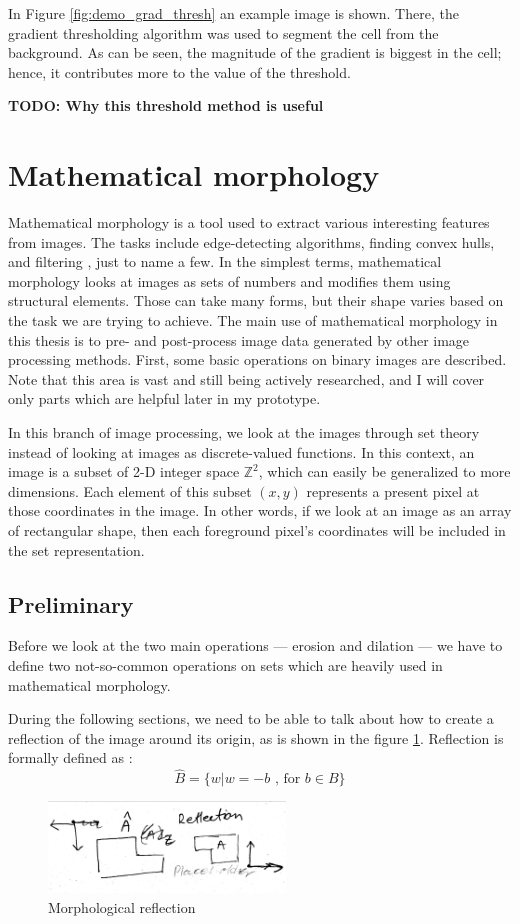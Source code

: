 \documentclass[
  digital,     %
  oneside,     %
  nosansbold,  %
  nocolorbold, %
  lof,         %
  lot,         %
]{fithesis4}
\newcommand*{\Z}{\ensuremath{\mathbb{Z}}}
\begin{document}
In Figure \ref{fig:demo_grad_thresh} an example image is shown. There, the
gradient thresholding algorithm was used to segment the cell from the
background. As can be seen, the magnitude of the gradient is biggest in the
cell; hence, it contributes more to the value of the threshold.

\textbf{TODO: Why this threshold method is useful}

\section{Mathematical morphology}

Mathematical morphology is a tool used to extract various interesting features
from images. The tasks include edge-detecting algorithms, finding convex hulls, and filtering
, just to name a few. In the simplest terms,
mathematical morphology looks at images as sets of numbers and modifies them using structural elements. Those can take many forms, but their shape varies based on the task we are trying
to achieve. The main use of mathematical morphology in this thesis is
to pre- and post-process image data generated by other image processing methods.
First, some basic operations on binary images are described. Note that
this area is vast and still being actively researched, and I will cover only parts which are helpful later in my
prototype.

In this branch of image processing, we look at the images through set theory
instead of looking at images as discrete-valued functions. In this context, an
image is a subset of 2-D integer space $\Z^2$, which can easily be generalized
to more dimensions. Each element of this subset $(x, y)$ represents a present
pixel at those coordinates in the image. In other words, if we look at an image
as an array of rectangular shape, then each foreground pixel's coordinates will
be included in the set representation.

\subsection{Preliminary}
Before we look at the two main operations --- erosion and dilation --- we have to
define two not-so-common operations on sets which are heavily used in
mathematical morphology.

During the following sections, we need to be able to talk about how to create a
reflection of the image around its origin, as is shown in the figure
\ref{fig:morp_refl}. Reflection is formally defined as \parencite{gonzalez2002}:
$$\hat{B} = \{w | w=-b \text{ , for } b \in B\}$$
\begin{figure}
    \begin{center}
        \includegraphics[width=6.3cm]{resources/morph_reflection.jpg}
    \end{center}
    \caption{Morphological reflection} %
    \label{fig:morp_refl}
\end{figure}
\end{document}
